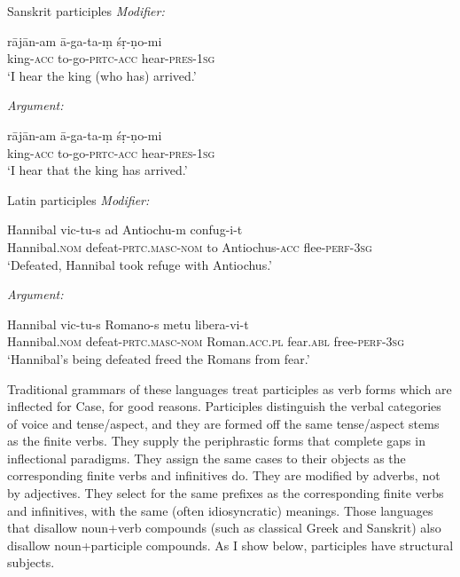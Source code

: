 \documentclass[output=paper,
modfonts
]{LSP/langsci}
\begin{document}
\begin{exe}
	\ex Sanskrit participles
		\ea \textit{Modifier:}
 
 		\gll rājān-am ā-ga-ta-ṃ śṛ-ṇo-mi \\
		king-\textsc{acc} to-go-\textsc{prtc}-\textsc{acc} hear-\textsc{pres}-\textsc{1sg}\\
		\glt `I hear the king (who has) arrived.' 

		\ex \textit{Argument:}

		\gll rājān-am  ā-ga-ta-ṃ śṛ-ṇo-mi \\
		king-\textsc{acc} to-go-\textsc{prtc}-\textsc{acc} hear-\textsc{pres}-\textsc{1sg}\\
		\glt `I hear that the king has arrived.'
		\z  

	\ex Latin participles
		\ea \textit{Modifier:}
 
 		\gll Hannibal vic-tu-s ad Antiochu-m confug-i-t\\
		Hannibal.\textsc{nom} defeat-\textsc{prtc}.\textsc{masc}-\textsc{nom} to Antiochus-\textsc{acc} flee-\textsc{perf}-\textsc{3sg}\\
		\glt `Defeated, Hannibal took refuge with Antiochus.' 

		\ex \textit{Argument:}

		\gll Hannibal vic-tu-s Romano-s metu libera-vi-t\\
		Hannibal.\textsc{nom} defeat-\textsc{prtc}.\textsc{masc}-\textsc{nom} Roman.\textsc{acc}.\textsc{pl}
		fear.\textsc{abl} free-\textsc{perf}-\textsc{3sg}\\
		\glt `Hannibal's being defeated freed the Romans from fear.'
		\z  
	\z    
\end{exe}
Traditional grammars of these languages treat participles as verb forms which are inflected for Case,
for good reasons.  Participles distinguish the verbal categories of voice and tense/aspect, and
they are formed off the same tense/aspect stems as the finite verbs.  They supply the
periphrastic forms that complete gaps in inflectional paradigms.  They assign the same cases to
their objects as the corresponding finite verbs and infinitives do.  They are modified by
adverbs, not by adjectives. They select for the same prefixes as the corresponding finite verbs
and infinitives, with the same (often idiosyncratic) meanings.  Those languages that disallow
noun+verb compounds (such as classical Greek and Sanskrit) also disallow noun+participle
compounds.  As I show below, participles have structural subjects.
\end{document}
